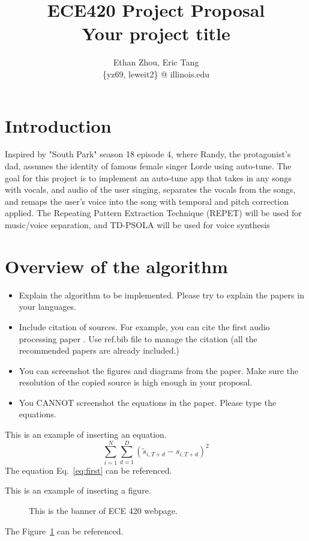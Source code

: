 \documentclass[journal,onecolumn, draftclsnofoot, 12pt]{IEEEtran}
\title{ECE420 Project Proposal\\ Your project title }
\author{Ethan Zhou, Eric Tang \\
\{yz69, leweit2\} @ illinois.edu}
\begin{document}
\maketitle
\section{Introduction}
Inspired by "South Park" season 18 episode 4, where Randy, the protagonist's dad, assumes the identity of famous female singer Lorde using auto-tune. The goal for this project is to implement an auto-tune app that takes in any songs with vocals, and audio of the user singing, separates the vocals from the songs, and remaps the user's voice into the song with temporal and pitch correction applied. The Repeating Pattern Extraction Technique (REPET) will be used for music/voice separation, and TD-PSOLA will be used for voice synthesis

\section{Overview of the algorithm}
\begin{itemize}
    \item Explain the algorithm to be implemented. Please try to explain the papers in your languages.
    \item Include citation of sources. For example, you can cite the first audio processing paper \cite{wang2003industrial}. Use ref.bib file to manage the citation (all the recommended papers are already included.)  
    \item You can screenshot the figures and diagrams from the paper. Make sure the resolution of the copied source is high enough in your proposal.
    \item You CANNOT screenshot the equations in the paper. Please type the equations. 
\end{itemize}


This is an example of inserting an equation. 
\begin{equation} \label{eq:first}
    \sum_{i=1}^N  \sum_{d=1}^D (\widetilde{s}_{i, T+d} - {s}_{i, T+d})^2
\end{equation}
The equation Eq.~\ref{eq:first} can be referenced. 


This is an example of inserting a figure. 
\begin{figure}[h]
\begin{center}
\caption{ This is the banner of ECE 420 webpage.  } 
\label{fig:banner}
\end{center}
\end{figure}
The Figure~\ref{fig:banner} can be referenced. 
\end{document}
